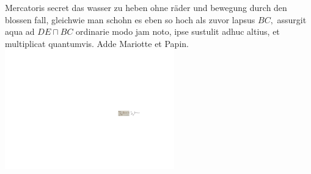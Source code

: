 \pend%
\pstart%
Mercatoris\protect{}
secret das wasser\protect{} zu heben
ohne r\"{a}der\protect{} und bewegung
durch den blossen fall,\protect{}
gleichwie man schohn es eben so hoch als zuvor
lapsus $BC,$ assurgit aqua ad $DE \sqcap BC$ ordinarie modo jam noto, ipse sustulit adhuc altius, et multiplicat quantumvis.
Adde Mariotte\protect{}
et Papin.\protect{}
\pend%
\vspace*{2.0em}
\pstart%
\centering
\includegraphics[width=0.55\textwidth]{images/lh0351202_150r-d1.pdf}\\
\pend%
\count{}
\count{}
\count{}
